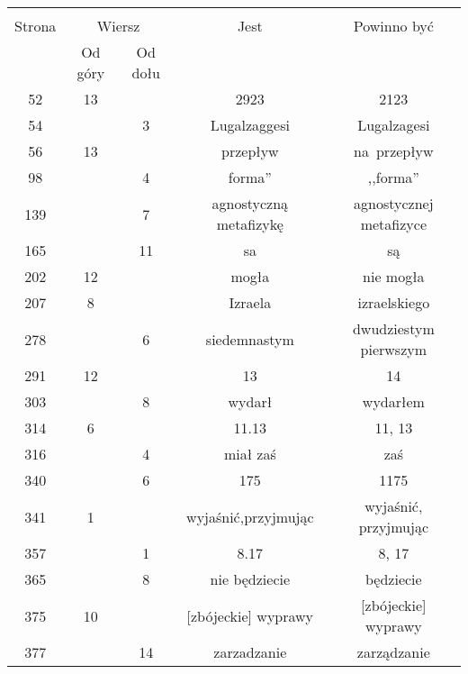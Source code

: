 \documentclass[a4paper,11pt]{article}
\begin{document}
\begin{center}
  \begin{tabular}{|c|c|c|c|c|}
    \hline
    & \multicolumn{2}{c|}{} & & \\
    Strona & \multicolumn{2}{c|}{Wiersz} & Jest
                              & Powinno być \\ \cline{2-3}
    & Od góry & Od dołu & & \\
    \hline
    52  & 13 & & 2923 & 2123 \\
    54  & &  3 & Lugalzaggesi & Lugalzagesi \\
    56  & 13 & & przepływ & na~przepływ \\
    98  & &  4 & forma'' & ,,forma'' \\
    139 & &  7 & agnostyczną metafizykę & agnostycznej metafizyce \\
    165 & & 11 & sa & są \\
    202 & 12 & & mogła & nie mogła \\
    207 &  8 & & Izraela & izraelskiego \\
    278 & &  6 & siedemnastym & dwudziestym pierwszym \\
    291 & 12 & & 13 & 14 \\
    303 & &  8 & wydarł & wydarłem \\
    314 &  6 & & 11.13 & 11, 13 \\
    316 & &  4 & miał zaś & zaś \\
    340 & &  6 & 175 & 1175 \\
    341 &  1 & & wyjaśnić,przyjmując & wyjaśnić, przyjmując \\
    357 & &  1 & 8.17 & 8, 17 \\
    365 & &  8 & nie będziecie & będziecie \\
    375 & 10 & & [zbójeckie]{ } wyprawy & [zbójeckie] wyprawy \\
    377 & & 14 & zarzadzanie & zarządzanie \\
    \hline
  \end{tabular}
\end{center}

\vspace{\spaceTwo}
\end{document}
